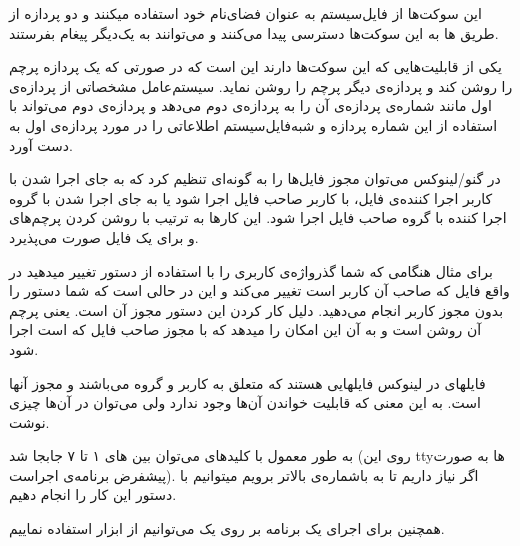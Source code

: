 این سوکت‌ها از فایل‌سیستم به عنوان فضای‌نام خود استفاده میکنند و دو پردازه از طریق ها به این سوکت‌ها دسترسی پیدا می‌کنند و می‌توانند به یک‌دیگر پیغام بفرستند.

یکی از قابلیت‌هایی که این سوکت‌ها دارند این است که در صورتی که یک پردازه پرچم  را روشن کند و پردازه‌ی دیگر پرچم  را روشن نماید. سیستم‌عامل مشخصاتی از پردازه‌ی اول مانند شماره‌ی پردازه‌ی آن را به پردازه‌ی دوم می‌دهد و پردازه‌ی دوم می‌تواند با استفاده از این شماره پردازه و شبه‌فایل‌سیستم  اطلاعاتی را در مورد پردازه‌ی اول به دست آورد.


در گنو/لینوکس می‌توان مجوز فایل‌ها را به گونه‌ای تنظیم کرد که به جای اجرا شدن با کاربر اجرا کننده‌ی فایل، با کاربر صاحب فایل اجرا شود یا به جای اجرا شدن با گروه اجرا کننده با گروه صاحب فایل اجرا شود. این کارها به ترتیب با روشن کردن پرچم‌های  و  برای یک فایل صورت می‌پذیرد. 

برای مثال هنگامی که شما گذرواژه‌ی کاربری را با استفاده از دستور  تغییر میدهید در واقع فایل  که صاحب آن کاربر  است تغییر می‌کند و این در حالی است که شما دستور  را بدون مجوز کاربر  انجام می‌دهید. دلیل کار کردن این دستور مجوز آن است. یعنی پرچم  آن روشن است و به آن این امکان را میدهد که با مجوز صاحب فایل که  است اجرا شود.


فایلهای  در لینوکس فایلهایی هستند که متعلق به کاربر  و گروه  می‌باشند و مجوز آنها  است. به این معنی که قابلیت خواندن آن‌ها وجود ندارد ولی می‌توان در آن‌ها چیزی نوشت. 

به طور معمول با کلید‌های  می‌توان بین های ۱ تا ۷ جابجا شد (روی این ttyها به صورت پیشفرض برنامه‌ی  اجراست). اگر نیاز داریم تا به  باشماره‌ی بالاتر برویم میتوانیم با دستور  این کار را انجام دهیم.

همچنین برای اجرای یک برنامه بر روی یک  می‌توانیم از ابزار  استفاده نماییم.



